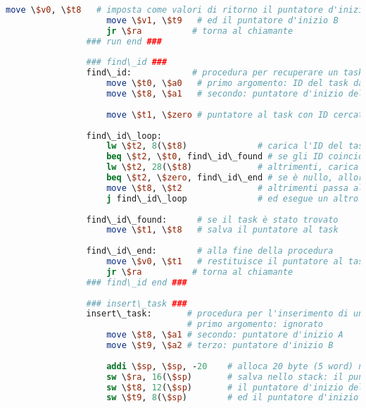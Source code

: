 \begin{center}
\begin{lstlisting}[language=mips, gobble=14, stepnumber=1]
                    move \$v0, \$t8   # imposta come valori di ritorno il puntatore d'inizio A
                    move \$v1, \$t9   # ed il puntatore d'inizio B
                    jr \$ra          # torna al chiamante
                ### run end ###
                
                ### find\_id ###
                find\_id:            # procedura per recuperare un task con un ID specifico
                    move \$t0, \$a0   # primo argomento: ID del task da recuperare
                    move \$t8, \$a1   # secondo: puntatore d'inizio della lista A
                    
                    move \$t1, \$zero # puntatore al task con ID cercato, inizializzato come nullo
                    
                find\_id\_loop:
                    lw \$t2, 8(\$t8)              # carica l'ID del task attuale
                    beq \$t2, \$t0, find\_id\_found # se gli ID coincidono, allora il task è stato trovato
                    lw \$t2, 28(\$t8)             # altrimenti, carica il puntatore al task successivo
                    beq \$t2, \$zero, find\_id\_end # se è nullo, allora si è raggiunta la fine senza trovare il task
                    move \$t8, \$t2               # altrimenti passa al successivo
                    j find\_id\_loop              # ed esegue un altro ciclo
                    
                find\_id\_found:      # se il task è stato trovato
                    move \$t1, \$t8   # salva il puntatore al task
                    
                find\_id\_end:        # alla fine della procedura
                    move \$v0, \$t1   # restituisce il puntatore al task trovato, o null se non è stato trovato
                    jr \$ra          # torna al chiamante
                ### find\_id end ###
                
                ### insert\_task ###
                insert\_task:		# procedura per l'inserimento di un nuovo task
                					# primo argomento: ignorato
                    move \$t8, \$a1	# secondo: puntatore d'inizio A
                    move \$t9, \$a2	# terzo: puntatore d'inizio B
                    
                    addi \$sp, \$sp, -20	# alloca 20 byte (5 word) nello stack frame
                    sw \$ra, 16(\$sp)		# salva nello stack: il puntatore di ritorno al chiamante
                    sw \$t8, 12(\$sp)		# il puntatore d'inizio della lista A
                    sw \$t9, 8(\$sp)		# ed il puntatore d'inizio della lista B
                

\end{lstlisting}
\end{center}
